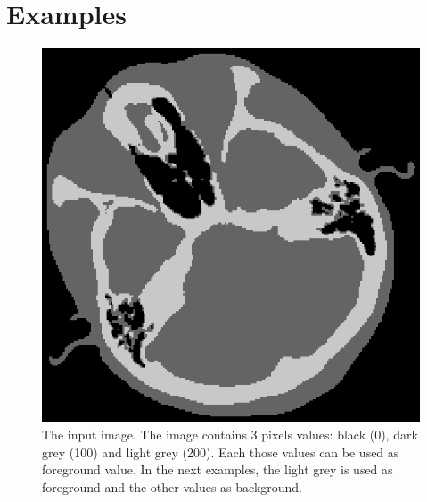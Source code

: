 \documentclass{InsightArticle}
\begin{document}
\section{Examples}

\begin{figure}[b]
\centering
\includegraphics{2th_cthead1.eps}
\caption{The input image. The image contains 3 pixels values: black (0), dark
grey (100) and light grey (200). Each those values can be used as foreground
value. In the next examples, the light grey is used as foreground and the other
values as background.\label{input}}
\end{figure}
\end{document}
